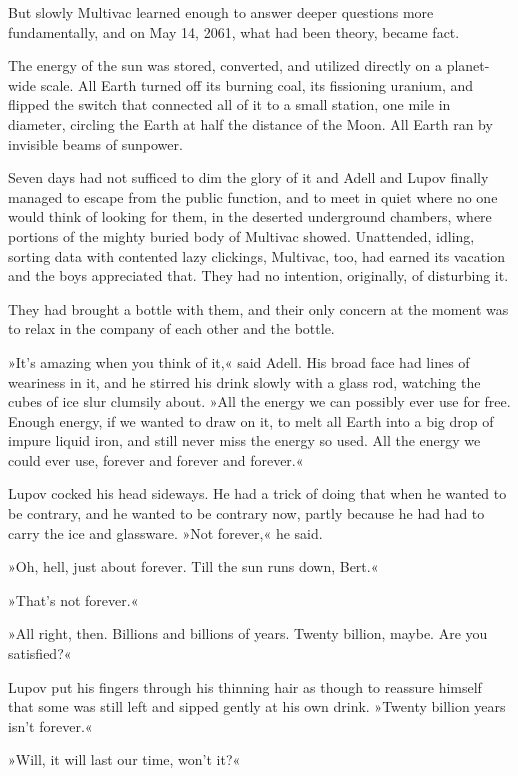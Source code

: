 \documentclass[11pt,twocolumn,paper=a5,pagesize,twoside]{article}
\newcommand{\q}[1]{»#1«}
\begin{document}
But slowly Multivac learned enough to answer deeper questions more 
fundamentally, and on May 14, 2061, what had been theory, became fact.

The energy of the sun was stored, converted, and utilized directly on a
planet-wide scale. All Earth turned off its burning coal, its 
fissioning uranium, and flipped the switch that connected all of it to
a small station, one mile in diameter, circling the Earth at half the 
distance of the Moon. All Earth ran by invisible beams of sunpower.

Seven days had not sufficed to dim the glory of it and Adell and Lupov 
finally managed to escape from the public function, and to meet in quiet 
where no one would think of looking for them, in the deserted underground 
chambers, where portions of the mighty buried body of Multivac showed. 
Unattended, idling, sorting data with contented lazy clickings, Multivac, 
too, had earned its vacation and the boys appreciated that. They had no 
intention, originally, of disturbing it.

They had brought a bottle with them, and their only concern at the moment 
was to relax in the company of each other and the bottle.

\q{It's amazing when you think of it,} said Adell. His broad face had lines 
of weariness in it, and he stirred his drink slowly with a glass rod, 
watching the cubes of ice slur clumsily about. 
\q{All the energy we can possibly ever use for free. Enough energy, if we 
wanted to draw on it, to melt all Earth into a big drop of impure liquid 
iron, and still never miss the energy so used. All the energy we could ever
use, forever and forever and forever.}

Lupov cocked his head sideways. He had a trick of doing that when he wanted 
to be contrary, and he wanted to be contrary now, partly because he had had 
to carry the ice and glassware. \q{Not forever,} he said.

\q{Oh, hell, just about forever. Till the sun runs down, Bert.}

\q{That's not forever.}

\q{All right, then. Billions and billions of years. Twenty billion, maybe. 
Are you satisfied?}

Lupov put his fingers through his thinning hair as though to reassure 
himself that some was still left and sipped gently at his own drink. 
\q{Twenty billion years isn't forever.}

\q{Will, it will last our time, won't it?}
\end{document}
